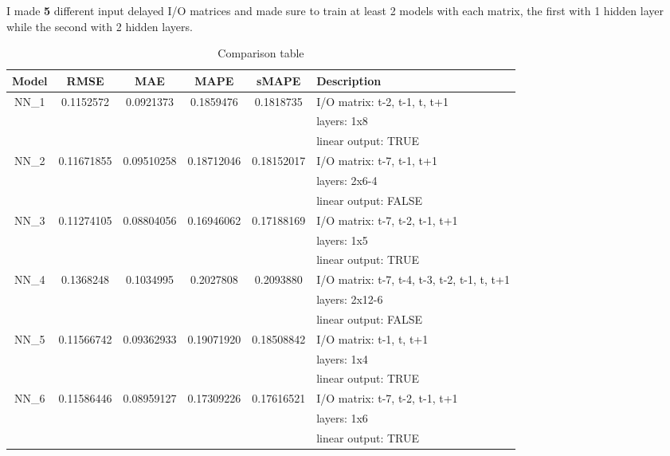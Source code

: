 \documentclass[11pt]{article}
\begin{document}
I made \textbf{5} different input delayed I/O matrices and made sure to train at least 2 models with each matrix, the first with 1 hidden layer while the second with 2 hidden layers.
\begin{table}[H]
\centering
\caption{Comparison table}
\label{tab:comparison}
\begin{tabular}{|c|c|c|c|c|p{6cm}|}
\hline
\textbf{Model} & \textbf{RMSE} & \textbf{MAE} & \textbf{MAPE} & \textbf{sMAPE} & \textbf{Description} \\
\hline
NN_1 & 0.1152572 & 0.0921373 & 0.1859476 & 0.1818735 & I/O matrix: t-2, t-1, t, t+1 \\
     & & & & & layers: 1x8 \\
                                            & & & & & linear output: TRUE\\
\hline
NN_2 & 0.11671855 & 0.09510258 & 0.18712046 & 0.18152017 & I/O matrix: t-7, t-1, t+1\\
                                            & & & & & layers: 2x6-4\\
                                            & & & & & linear output: FALSE\\
\hline
NN_3 & 0.11274105 & 0.08804056 & 0.16946062 & 0.17188169 & I/O matrix: t-7, t-2, t-1, t+1\\
                                            & & & & & layers: 1x5 \\
                                            & & & & & linear output: TRUE\\
\hline
NN_4 & 0.1368248 & 0.1034995 & 0.2027808 & 0.2093880 & I/O matrix: t-7, t-4, t-3, t-2, t-1, t, t+1 \\
                                            & & & & & layers: 2x12-6\\
                                            & & & & & linear output: FALSE\\
\hline
NN_5 & 0.11566742 & 0.09362933 & 0.19071920 & 0.18508842 & I/O matrix: t-1, t, t+1\\
                                            & & & & & layers: 1x4 \\
                                            & & & & & linear output: TRUE\\
\hline 
NN_6 & 0.11586446 & 0.08959127 & 0.17309226 & 0.17616521 & I/O matrix: t-7, t-2, t-1, t+1\\
                                            & & & & & layers: 1x6\\
                                            & & & & & linear output: TRUE\\

\end{tabular}
\end{table}
\end{document}

